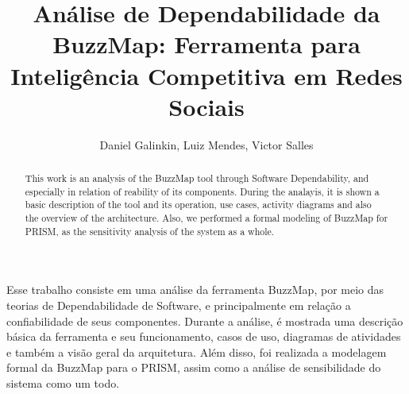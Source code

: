 \documentclass[12pt]{article}
\title{Análise de Dependabilidade da BuzzMap: Ferramenta para Inteligência
Competitiva em Redes Sociais}
\author{Daniel Galinkin\inst{1}, Luiz Mendes\inst{1}, Victor Salles\inst{1}}
\begin{document}
 

\maketitle

\begin{abstract}
 This work is an analysis of the BuzzMap tool through Software Dependability,
 and especially in relation of reability of its components. During the
 analayis, it is shown a basic description of the tool and its operation, use
 cases, activity diagrams and also the overview of the architecture. Also,
 we performed a formal modeling of BuzzMap for PRISM, as the sensitivity
 analysis of the system as a whole.
\end{abstract}
     
\begin{resumo} 
  Esse trabalho consiste em uma análise da ferramenta BuzzMap, por
  meio das teorias de Dependabilidade de Software, e principalmente em relação
  a confiabilidade de seus componentes. Durante a análise, é mostrada uma
  descrição básica da ferramenta e seu funcionamento, casos de uso, diagramas
  de atividades e também a visão geral da arquitetura. Além
  disso, foi realizada a modelagem formal da BuzzMap para o PRISM, assim como
  a análise de sensibilidade do sistema como um todo.
\end{resumo}












\nocite{*}


\end{document}
